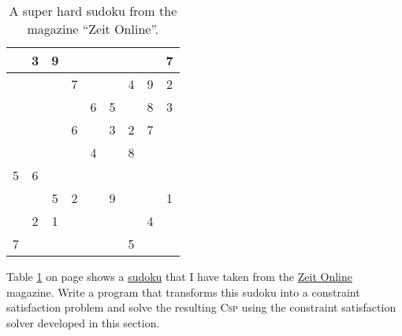\begin{table}[h]
  \centering
  \begin{tabular}{||c|c|c||c|c|c||c|c|c||}
    \hline
    \hline
      & 3 & 9 &   &   &   &   &   & 7 \\
    \hline
      &   &   & 7 &   &   & 4 & 9 & 2 \\
    \hline
      &   &   &   & 6 & 5 &   & 8 & 3 \\
    \hline
    \hline
      &   &   & 6 &   & 3 & 2 & 7 &   \\
    \hline
      &   &   &   & 4 &   & 8 &   &   \\
    \hline
    5 & 6 &   &   &   &   &   &   &   \\
    \hline
    \hline
      &   & 5 & 2 &   & 9 &   &   & 1 \\
    \hline
      & 2 & 1 &   &   &   &   & 4 &   \\
    \hline
    7 &   &   &   &   &   & 5 &   &   \\
    \hline
    \hline
  \end{tabular}
  \caption{A super hard sudoku from the magazine ``Zeit Online''.}
  \label{tab:sudoku}
\end{table}

\exercise
Table \ref{tab:sudoku} on page \pageref{tab:sudoku} shows a \href{https://en.wikipedia.org/wiki/Sudoku}{sudoku}
that I have taken from the
\href{http://sudoku.zeit.de/cgi-bin/sudoku/sudoku_kd_app_2016.pl?action=level&kd_nr=24091123601092&year=2018&month=03&day=23&level=-c+5}{Zeit Online}
magazine.  Write a program that transforms this sudoku into a constraint satisfaction problem and solve the
resulting \textsc{Csp} using the constraint satisfaction solver developed in this section.
\eoxs

